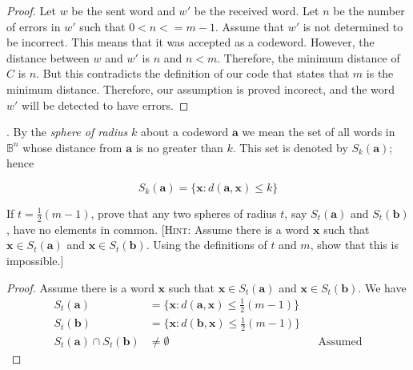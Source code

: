 \documentclass[twoside]{amsart}
\begin{document}
\begin{enumerate}[A.]
      \begin{proof}
	 Let $w$ be the sent word and $w'$ be the received word. Let 
	 $n$ be the number of errors in $w'$ such that $0 < n <= m - 1$. 
	 Assume that $w'$ is not determined to be incorrect. This means
	 that it was accepted as a codeword. However, the distance
	 between $w$ and $w'$ is $n$ and $n < m$. Therefore, the 
	 minimum distance of $C$ is $n$. But this contradicts
	 the definition of our code that states that $m$ is the minimum
	 distance. Therefore, our assumption is proved incorect, and
	 the word $w'$ will be detected to have errors.
      \end{proof}

      . By the \emph{sphere of radius} $k$ about a codeword
      $\mathbf{a}$ we mean the set of all words in $\mathbb{B}^n$
      whose distance from $\mathbf{a}$ is no greater than $k$. This set
      is denoted by $S_k(\mathbf{a})$; hence 
      \begin{center}
      $$ S_k(\mathbf{a}) = \{\mathbf{x} : d(\mathbf{a},\mathbf{x}) \le k \}$$
      \end{center}

      If $t=\frac{1}{2}(m-1)$, prove that any two spheres of radius $t$,
      say $S_t(\mathbf{a})$ and $S_t(\mathbf{b})$, have no elements in
      common. [\textsc{Hint}: Assume there is a word $\mathbf{x}$ such
      that $\mathbf{x} \in S_t(\mathbf{a})$ and $\mathbf{x}\in S_t(
      \mathbf{b})$. Using the definitions of $t$ and $m$, show that
      this is impossible.]

      \begin{proof}
         Assume there is a word $\mathbf{x}$ such that $\mathbf{x} \in
         S_t(\mathbf{a})$ and $\mathbf{x}\in S_t( \mathbf{b})$. 
         We have
         \begin{align*}
	 S_t(\mathbf{a}) & = \{\mathbf{x} : d(\mathbf{a},\mathbf{x}) 
	    \le \frac{1}{2}(m-1) \} \\
         S_t(\mathbf{b}) & = \{\mathbf{x} : d(\mathbf{b},\mathbf{x}) 
	    \le \frac{1}{2}(m-1) \} \\
	    S_t(\mathbf{a}) \cap S_t(\mathbf{b}) & \ne \emptyset 
	        && \text{Assumed}
         \end{align*}
      \end{proof}

\end{enumerate}
\end{document}
